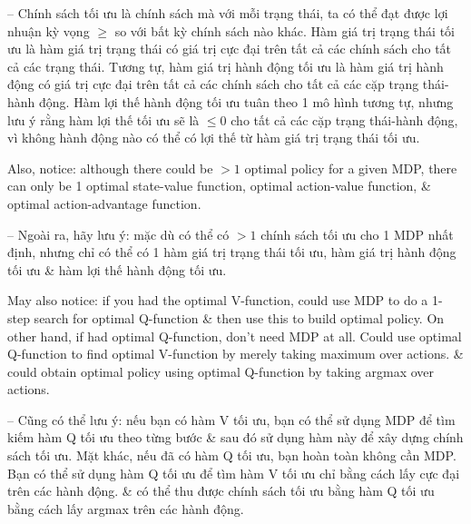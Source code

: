 \documentclass{article}
\begin{document}
\begin{itemize}
\begin{itemize}
\begin{itemize}
            -- Chính sách tối ưu là chính sách mà với mỗi trạng thái, ta có thể đạt được lợi nhuận kỳ vọng $\ge$ so với bất kỳ chính sách nào khác. Hàm giá trị trạng thái tối ưu là hàm giá trị trạng thái có giá trị cực đại trên tất cả các chính sách cho tất cả các trạng thái. Tương tự, hàm giá trị hành động tối ưu là hàm giá trị hành động có giá trị cực đại trên tất cả các chính sách cho tất cả các cặp trạng thái-hành động. Hàm lợi thế hành động tối ưu tuân theo 1 mô hình tương tự, nhưng lưu ý rằng hàm lợi thế tối ưu sẽ là $\le0$ cho tất cả các cặp trạng thái-hành động, vì không hành động nào có thể có lợi thế từ hàm giá trị trạng thái tối ưu.

            Also, notice: although there could be $> 1$ optimal policy for a given MDP, there can only be 1 optimal state-value function, optimal action-value function, \& optimal action-advantage function.

            -- Ngoài ra, hãy lưu ý: mặc dù có thể có $> 1$ chính sách tối ưu cho 1 MDP nhất định, nhưng chỉ có thể có 1 hàm giá trị trạng thái tối ưu, hàm giá trị hành động tối ưu \& hàm lợi thế hành động tối ưu.

            May also notice: if you had the optimal V-function, could use MDP to do a 1-step search for optimal Q-function \& then use this to build optimal policy. On other hand, if had optimal Q-function, don't need MDP at all. Could use optimal Q-function to find optimal V-function by merely taking maximum over actions. \& could obtain optimal policy using optimal Q-function by taking argmax over actions.

            -- Cũng có thể lưu ý: nếu bạn có hàm V tối ưu, bạn có thể sử dụng MDP để tìm kiếm hàm Q tối ưu theo từng bước \& sau đó sử dụng hàm này để xây dựng chính sách tối ưu. Mặt khác, nếu đã có hàm Q tối ưu, bạn hoàn toàn không cần MDP. Bạn có thể sử dụng hàm Q tối ưu để tìm hàm V tối ưu chỉ bằng cách lấy cực đại trên các hành động. \& có thể thu được chính sách tối ưu bằng hàm Q tối ưu bằng cách lấy argmax trên các hành động.


\end{itemize}
\end{itemize}
\end{itemize}
\end{document}
